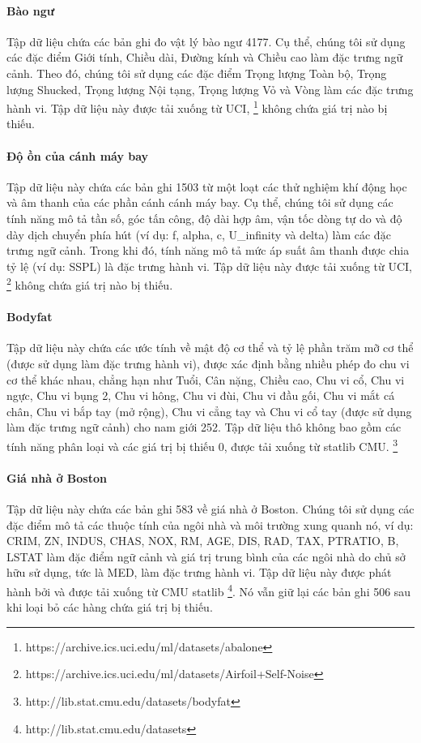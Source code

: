 \paragraph{Bào ngư} Tập dữ liệu chứa các bản ghi đo vật lý bào ngư 4177. Cụ thể, chúng tôi sử dụng các đặc điểm Giới tính, Chiều dài, Đường kính và Chiều cao làm đặc trưng ngữ cảnh. Theo đó, chúng tôi sử dụng các đặc điểm Trọng lượng Toàn bộ, Trọng lượng Shucked, Trọng lượng Nội tạng, Trọng lượng Vỏ và Vòng làm các đặc trưng hành vi. Tập dữ liệu này được tải xuống từ UCI, \footnote{https://archive.ics.uci.edu/ml/datasets/abalone} không chứa giá trị nào bị thiếu.


\paragraph{Độ ồn của cánh máy bay} Tập dữ liệu này chứa các bản ghi 1503 từ một loạt các thử nghiệm khí động học và âm thanh của các phần cánh cánh máy bay. Cụ thể, chúng tôi sử dụng các tính năng mô tả tần số, góc tấn công, độ dài hợp âm, vận tốc dòng tự do và độ dày dịch chuyển phía hút (ví dụ: f, alpha, c, U\_infinity và delta) làm các đặc trưng ngữ cảnh. Trong khi đó, tính năng mô tả mức áp suất âm thanh được chia tỷ lệ (ví dụ: SSPL) là đặc trưng hành vi. Tập dữ liệu này được tải xuống từ UCI, \footnote{https://archive.ics.uci.edu/ml/datasets/Airfoil+Self-Noise} không chứa giá trị nào bị thiếu.\paragraph{Bodyfat} Tập dữ liệu này chứa các ước tính về mật độ cơ thể và
tỷ lệ phần trăm mỡ cơ thể (được sử dụng làm đặc trưng hành vi), được xác định bằng nhiều phép đo chu vi cơ thể khác nhau, chẳng hạn như Tuổi, Cân nặng, Chiều cao, Chu vi cổ, Chu vi ngực, Chu vi bụng 2, Chu vi hông, Chu vi đùi, Chu vi đầu gối, Chu vi mắt cá chân, Chu vi bắp tay (mở rộng), Chu vi cẳng tay và Chu vi cổ tay (được sử dụng làm đặc trưng ngữ cảnh) cho nam giới 252. Tập dữ liệu thô không bao gồm các tính năng phân loại và các giá trị bị thiếu 0, được tải xuống từ statlib CMU. \footnote{http://lib.stat.cmu.edu/datasets/bodyfat}


\paragraph{Giá nhà ở Boston} Tập dữ liệu này chứa các bản ghi 583 về giá nhà ở Boston. Chúng tôi sử dụng các đặc điểm mô tả các thuộc tính của ngôi nhà và môi trường xung quanh nó, ví dụ: CRIM, ZN, INDUS, CHAS, NOX, RM, AGE, DIS, RAD, TAX, PTRATIO, B, LSTAT làm đặc điểm ngữ cảnh và giá trị trung bình của các ngôi nhà do chủ sở hữu sử dụng, tức là MED, làm đặc trưng hành vi. Tập dữ liệu này được phát hành bởi \cite{harrison1978hedonic} và được tải xuống từ CMU statlib \footnote{http://lib.stat.cmu.edu/datasets}. Nó vẫn giữ lại các bản ghi 506 sau khi loại bỏ các hàng chứa giá trị bị thiếu.


